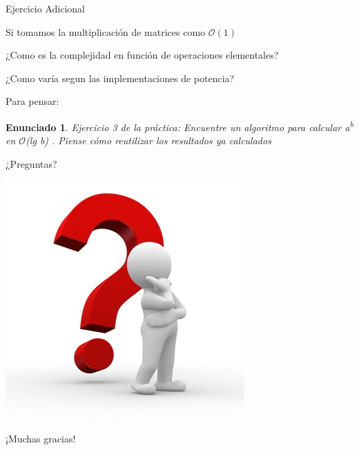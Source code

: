 \documentclass[pdf]{beamer}
\newtheorem{enun}{Enunciado}
\begin{document}
\begin{frame}{Ejercicio Adicional}
    \par{Si tomamos la multiplicación de matrices como $\mathcal{O}(1)$}
    \par{¿Como es la complejidad en función de operaciones elementales?}
    
    \pause
    \vspace{1em}
    ¿Como varía segun las implementaciones de potencia?
    
    \pause
    \vspace{1em}
    Para pensar:
    
    \begin{enun}
	Ejercicio 3 de la práctica:
	Encuentre un algoritmo para calcular a\textsuperscript{b} en $\mathcal{O}$(lg b) . Piense cómo reutilizar los resultados
	ya calculados
	
    \end{enun}
    
\end{frame}

\begin{frame}
    \huge{¿Preguntas?}
    \begin{center}
        \includegraphics[scale=0.4]{img/question-mark.jpg}
    \end{center}
    \large{¡Muchas gracias!}
\end{frame}
\end{document}
